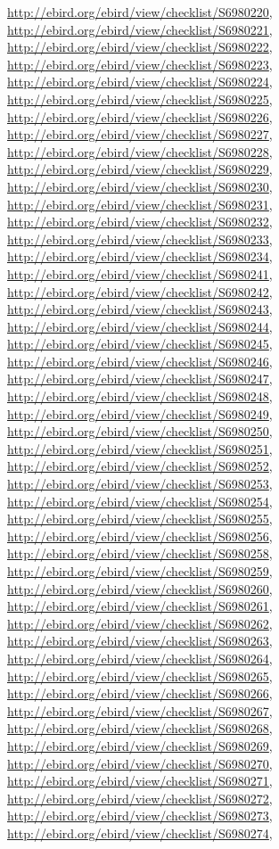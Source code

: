 \documentclass[9pt, article]{memoir}
\begin{document}
\begin{multicols}{2}
\url{http://ebird.org/ebird/view/checklist/S6980220}, 
\url{http://ebird.org/ebird/view/checklist/S6980221}, 
\url{http://ebird.org/ebird/view/checklist/S6980222}, 
\url{http://ebird.org/ebird/view/checklist/S6980223}, 
\url{http://ebird.org/ebird/view/checklist/S6980224}, 
\url{http://ebird.org/ebird/view/checklist/S6980225}, 
\url{http://ebird.org/ebird/view/checklist/S6980226}, 
\url{http://ebird.org/ebird/view/checklist/S6980227}, 
\url{http://ebird.org/ebird/view/checklist/S6980228}, 
\url{http://ebird.org/ebird/view/checklist/S6980229}, 
\url{http://ebird.org/ebird/view/checklist/S6980230}, 
\url{http://ebird.org/ebird/view/checklist/S6980231}, 
\url{http://ebird.org/ebird/view/checklist/S6980232}, 
\url{http://ebird.org/ebird/view/checklist/S6980233}, 
\url{http://ebird.org/ebird/view/checklist/S6980234}, 
\url{http://ebird.org/ebird/view/checklist/S6980241}, 
\url{http://ebird.org/ebird/view/checklist/S6980242}, 
\url{http://ebird.org/ebird/view/checklist/S6980243}, 
\url{http://ebird.org/ebird/view/checklist/S6980244}, 
\url{http://ebird.org/ebird/view/checklist/S6980245}, 
\url{http://ebird.org/ebird/view/checklist/S6980246}, 
\url{http://ebird.org/ebird/view/checklist/S6980247}, 
\url{http://ebird.org/ebird/view/checklist/S6980248}, 
\url{http://ebird.org/ebird/view/checklist/S6980249}, 
\url{http://ebird.org/ebird/view/checklist/S6980250}, 
\url{http://ebird.org/ebird/view/checklist/S6980251}, 
\url{http://ebird.org/ebird/view/checklist/S6980252}, 
\url{http://ebird.org/ebird/view/checklist/S6980253}, 
\url{http://ebird.org/ebird/view/checklist/S6980254}, 
\url{http://ebird.org/ebird/view/checklist/S6980255}, 
\url{http://ebird.org/ebird/view/checklist/S6980256}, 
\url{http://ebird.org/ebird/view/checklist/S6980258}, 
\url{http://ebird.org/ebird/view/checklist/S6980259}, 
\url{http://ebird.org/ebird/view/checklist/S6980260}, 
\url{http://ebird.org/ebird/view/checklist/S6980261}, 
\url{http://ebird.org/ebird/view/checklist/S6980262}, 
\url{http://ebird.org/ebird/view/checklist/S6980263}, 
\url{http://ebird.org/ebird/view/checklist/S6980264}, 
\url{http://ebird.org/ebird/view/checklist/S6980265}, 
\url{http://ebird.org/ebird/view/checklist/S6980266}, 
\url{http://ebird.org/ebird/view/checklist/S6980267}, 
\url{http://ebird.org/ebird/view/checklist/S6980268}, 
\url{http://ebird.org/ebird/view/checklist/S6980269}, 
\url{http://ebird.org/ebird/view/checklist/S6980270}, 
\url{http://ebird.org/ebird/view/checklist/S6980271}, 
\url{http://ebird.org/ebird/view/checklist/S6980272}, 
\url{http://ebird.org/ebird/view/checklist/S6980273}, 
\url{http://ebird.org/ebird/view/checklist/S6980274}, 

\end{multicols}
\end{document}
